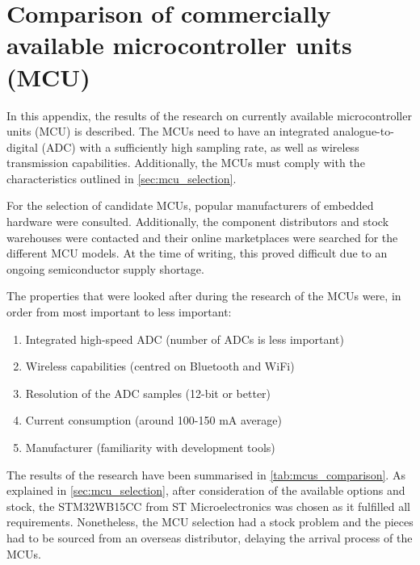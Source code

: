 \chapter{Comparison of commercially available microcontroller units (MCU)} \label{app:mcu_comparison}

In this appendix, the results of the research on currently available microcontroller units (MCU) is described. The MCUs need to have an integrated analogue-to-digital (ADC) with a sufficiently high sampling rate, as well as wireless transmission capabilities. Additionally, the MCUs must comply with the characteristics outlined in \cref{sec:mcu_selection}.

For the selection of candidate MCUs, popular manufacturers of embedded hardware were consulted. Additionally, the component distributors and stock warehouses were contacted and their online marketplaces were searched for the different MCU models. At the time of writing, this proved difficult due to an ongoing semiconductor supply shortage.

The properties that were looked after during the research of the MCUs were, in order from most important to less important:
\begin{enumerate}
	\item Integrated high-speed ADC (number of ADCs is less important)
	\item Wireless capabilities (centred on Bluetooth and WiFi)
	\item Resolution of the ADC samples (12-bit or better)
	\item Current consumption (around 100-150 mA average)
	\item Manufacturer (familiarity with development tools)
\end{enumerate}

The results of the research have been summarised in \cref{tab:mcus_comparison}. As explained in \cref{sec:mcu_selection}, after consideration of the available options and stock, the STM32WB15CC \cite{STMicroelectronics2022} from ST Microelectronics was chosen as it fulfilled all requirements. Nonetheless, the MCU selection had a stock problem and the pieces had to be sourced from an overseas distributor, delaying the arrival process of the MCUs.

